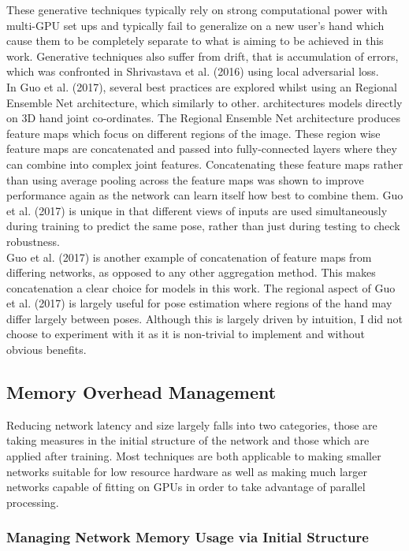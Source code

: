 \documentclass{article}
\begin{document}
These generative techniques typically rely on strong computational power with multi-GPU set ups and typically fail to generalize on a new user's hand which cause them to be completely separate to what is aiming to be achieved in this work. Generative techniques also suffer from drift, that is accumulation of errors, which was confronted in Shrivastava et al. (2016) using local adversarial loss.\\ 

In Guo et al. (2017), several best practices are explored whilst using an Regional Ensemble Net architecture, which similarly to other. architectures models directly on 3D hand joint co-ordinates. The Regional Ensemble Net architecture produces feature maps which focus on different regions of the image. These region wise feature maps are concatenated and passed into fully-connected layers where they can combine into complex joint features. Concatenating these feature maps rather than using average pooling across the feature maps was shown to improve performance again as the network can learn itself how best to combine them. Guo et al. (2017) is unique in that different views of inputs are used simultaneously during training to predict the same pose, rather than just during testing to check robustness. \\

Guo et al. (2017) is another example of concatenation of feature maps from differing networks, as opposed to any other aggregation method. This makes concatenation a clear choice for models in this work. The regional aspect of Guo et al. (2017) is largely useful for pose estimation where regions of the hand may differ largely between poses. Although this is largely driven by intuition, I did not choose to experiment with it as it is non-trivial to implement and without obvious benefits. \\

\subsection{Memory Overhead Management}
Reducing network latency and size largely falls into two categories, those are taking measures in the initial structure of the network and those which are applied after training. Most techniques are both applicable to making smaller networks suitable for low resource hardware as well as making much larger networks capable of fitting on GPUs in order to take advantage of parallel processing.

\subsubsection{Managing Network Memory Usage via Initial Structure}
\end{document}
